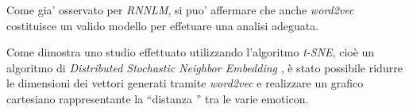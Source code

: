 \documentclass[a4paper,12pt,openright,twoside]{report}
\theoremstyle{definition}
\begin{document}
Come gia' osservato per \emph{RNNLM},
si puo' affermare che anche \emph{word2vec} costituisce un valido modello
per effetuare una analisi adeguata.

%

Come dimostra uno studio effettuato utilizzando l'algoritmo
\emph{t-SNE}, cioè un algoritmo di \emph{Distributed Stochastic Neighbor Embedding }, è stato possibile
ridurre le dimensioni dei vettori generati tramite \emph{word2vec} e realizzare un grafico cartesiano rappresentante la ``distanza ''
tra le varie emoticon.
\end{document}
